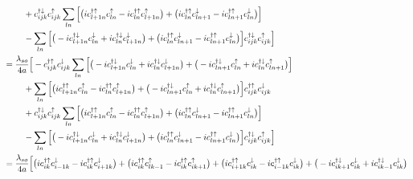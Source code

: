 \documentclass[10pt,prb,showpacs,amssymb,floatfix]{revtex4-1}
\newcommand{\dg}{\dagger}
\newcommand{\dna}{\downarrow}
\newcommand{\nn}{\nonumber}
\newcommand{\upa}{\uparrow}
\begin{document}
\begin{align}
& ~~~~~~~ + c_{ijk}^{\dg\dna} c_{ijk}^{\upa}  \sum_{ln}  \Big{[} \big{(}i c_{l+1n}^{\dagger \uparrow} c_{l n}^\uparrow - i c_{l n}^{\dagger  \uparrow}  c_{l+1n}^{\uparrow}   \big{)} +  \big{(} i c_{l n}^{\dagger \uparrow} c_{l n+1}^{ \downarrow}    - i c_{ln+1}^{\dagger \uparrow}  c_{ln}^\downarrow  \big{)}  \Big{]} \nn\\
& ~~~~~~~  - \sum_{ln}  \Big{[} \big{(}  - i c_{l+1n}^{\dagger \downarrow} c_{ln}^\downarrow + i c_{ln}^{\dagger \downarrow} c_{l+1n}^{ \downarrow}  \big{)} +  \big{(} i c_{l n}^{\dagger \uparrow} c_{l n+1}^{ \downarrow}    - i c_{ln+1}^{\dagger \uparrow}  c_{ln}^\downarrow  \big{)}  \Big{]} c_{ijk}^{\dg\dna} c_{ijk}^{\upa}  \Big{]} \nn\\
&= \frac{\lambda_{so}}{4a} \Big{[}  - c_{ijk}^{\dg\upa} c_{ijk}^{\dna}  \sum_{ln}  \Big{[} \big{(}  - i c_{l+1n}^{\dagger \downarrow} c_{ln}^\downarrow + i c_{ln}^{\dagger  \downarrow} c_{l+1n}^{\downarrow} \big{)} +  \big{(} -i c_{l n+1}^{\dagger \downarrow}  c_{l n}^\uparrow + i  c_{l n}^{\dagger  \downarrow} c_{l n+1}^{\uparrow}    \big{)}  \Big{]} \nn\\
& ~~~~~~~ + \sum_{ln}  \Big{[} \big{(}i c_{l+1n}^{\dagger \uparrow} c_{l n}^\uparrow - i c_{l n}^{\dagger \uparrow} c_{l+1n}^{\uparrow}   \big{)} +  \big{(} -i c_{l n+1}^{\dagger \downarrow}  c_{l n}^\uparrow + i c_{l n}^{\dagger  \downarrow} c_{l n+1}^{\uparrow}    \big{)}  \Big{]}  c_{ijk}^{\dg\upa} c_{ijk}^{\dna} \nn\\
& ~~~~~~~ + c_{ijk}^{\dg\dna} c_{ijk}^{\upa}  \sum_{ln}  \Big{[} \big{(}i c_{l+1n}^{\dagger \uparrow} c_{l n}^\uparrow - i c_{l n}^{\dagger  \uparrow}  c_{l+1n}^{\uparrow}   \big{)} +  \big{(} i c_{l n}^{\dagger \uparrow} c_{l n+1}^{ \downarrow}    - i c_{ln+1}^{\dagger \uparrow}  c_{ln}^\downarrow  \big{)}  \Big{]} \nn\\
& ~~~~~~~  - \sum_{ln}  \Big{[} \big{(}  - i c_{l+1n}^{\dagger \downarrow} c_{ln}^\downarrow + i c_{ln}^{\dagger \downarrow} c_{l+1n}^{ \downarrow}  \big{)} +  \big{(} i c_{l n}^{\dagger \uparrow} c_{l n+1}^{ \downarrow}    - i c_{ln+1}^{\dagger \uparrow}  c_{ln}^\downarrow  \big{)}  \Big{]} c_{ijk}^{\dg\dna} c_{ijk}^{\upa}  \Big{]} \nn\\
&= \frac{\lambda_{so}}{4a} \Big{[}    \big{(}  i  c_{ik}^{\dg\upa}  c_{i-1k}^\downarrow - i c_{ik}^{\dg\upa}  c_{i+1k}^{\downarrow} \big{)} +  \big{(} i  c_{ik}^{\dg\upa} c_{l k-1}^\uparrow - i  c_{ik}^{\dg\upa}  c_{i k+1}^{\uparrow}    \big{)}  +  \big{(}i c_{i+1k}^{\dagger \uparrow} c_{ik}^{\dna}  - i c_{i-1 k}^{\dagger \uparrow} c_{ik}^{\dna}   \big{)} +  \big{(} -i c_{i k+1}^{\dagger \downarrow}  c_{ik}^{\dna} + i c_{i k-1}^{\dagger  \downarrow} c_{ik}^{\dna}\big{)}   \nn\\

\end{align}
\end{document}
